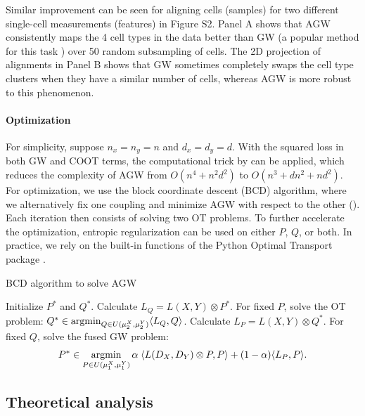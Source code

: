 Similar improvement can be seen for aligning cells (samples) for two different single-cell
measurements (features) \citep{SNAREseq} in Figure S2. Panel A shows that AGW consistently maps
the 4 cell types in the data better than GW (a popular method for this task
\citep{Pamona,Demetci20,Demetci22,UniPort}) over 50 random subsampling of cells.
The 2D projection of alignments in Panel B shows that GW sometimes completely swaps
the cell type clusters when they have a similar number of cells, whereas AGW is more robust
to this phenomenon.

\paragraph{Optimization} For simplicity, suppose $n_x = n_y = n$ and $d_x = d_y = d$.
With the squared loss in both GW and COOT terms, the computational trick by \citep{Peyre16}
can be applied, which reduces the complexity of AGW from $O(n^4 + n^2 d^2)$
to $O(n^3 + dn^2 + nd^2)$. For optimization, we use the block coordinate descent (BCD) algorithm,
where we alternatively fix one coupling and minimize AGW with respect to the other ().
Each iteration then consists of solving two OT problems. To further accelerate the optimization,
entropic regularization can be used \citep{Cuturi13} on either $P$, $Q$, or both.
In practice, we rely on the built-in functions of the Python Optimal Transport package \citep{Flamary21}.

\begin{algorithm}[t]
    \caption{BCD algorithm to solve AGW \label{alg:bcd_agw}}
    \begin{algorithmic}[1]
      \STATE Initialize $P^*$ and $Q^*$.
      \REPEAT
      \STATE Calculate $L_Q = L(X, Y) \otimes P^*$.
      \STATE For fixed $P$, solve the OT problem:
      $Q^* \in \operatorname*{argmin}_{Q \in U(\mu_2^X, \mu_2^Y)} \langle L_Q, Q \rangle$.
      \STATE Calculate $L_P = L(X, Y) \otimes Q^*$.
      \STATE For fixed $Q$, solve the fused GW problem:
      \begin{align}
        P^* \in \operatorname*{argmin}_{P \in U(\mu_1^X, \mu_1^Y)}
        \alpha \; \langle L(D_X,D_Y) \otimes P, P \rangle + (1-\alpha) \langle L_P, P \rangle.
      \end{align}
\end{algorithmic}
\end{algorithm}

\subsection{Theoretical analysis} \label{subsec:agw_property}

